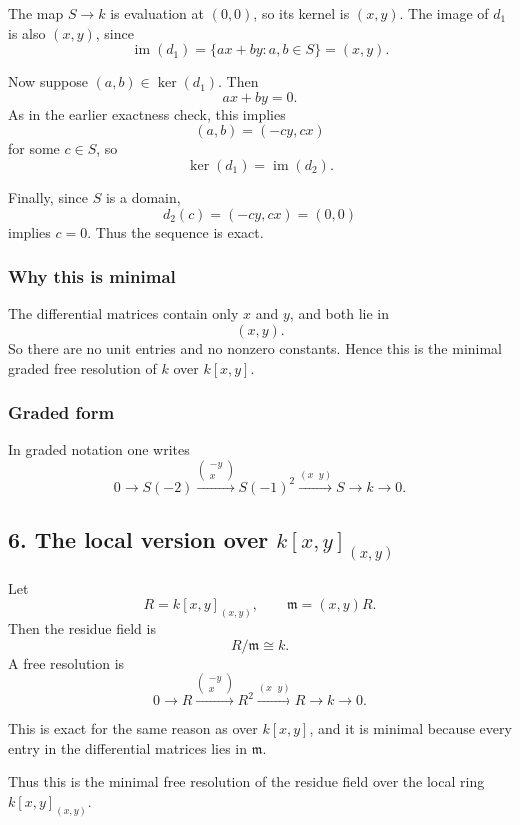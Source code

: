 \documentclass[12pt,a4paper]{article}
\theoremstyle{notespace}
\theoremstyle{definition}
\begin{document}
The map \(S\to k\) is evaluation at \((0,0)\), so its kernel is \((x,y)\).
The image of \(d_1\) is also \((x,y)\), since
\[
\operatorname{im}(d_1)=\{ax+by:a,b\in S\}=(x,y).
\]

Now suppose \((a,b)\in \ker(d_1)\). Then
\[
ax+by=0.
\]
As in the earlier exactness check, this implies
\[
(a,b)=(-cy,cx)
\]
for some \(c\in S\), so
\[
\ker(d_1)=\operatorname{im}(d_2).
\]

Finally, since \(S\) is a domain,
\[
d_2(c)=(-cy,cx)=(0,0)
\]
implies \(c=0\).
Thus the sequence is exact.

\subsubsection*{Why this is minimal}

The differential matrices contain only \(x\) and \(y\), and both lie in
\[
(x,y).
\]
So there are no unit entries and no nonzero constants.
Hence this is the minimal graded free resolution of \(k\) over \(k[x,y]\).

\subsubsection*{Graded form}

In graded notation one writes
\[
0 \longrightarrow S(-2) \xrightarrow{\begin{pmatrix}-y\\x\end{pmatrix}} S(-1)^2
\xrightarrow{(x\;\;y)} S \longrightarrow k \longrightarrow 0.
\]

\subsection{6. The local version over \(k[x,y]_{(x,y)}\)}

Let
\[
R=k[x,y]_{(x,y)},
\qquad
\mathfrak m=(x,y)R.
\]
Then the residue field is
\[
R/\mathfrak m \cong k.
\]
A free resolution is
\[
0 \longrightarrow R \xrightarrow{\begin{pmatrix}-y\\x\end{pmatrix}} R^2
\xrightarrow{(x\;\;y)} R \longrightarrow k \longrightarrow 0.
\]

This is exact for the same reason as over \(k[x,y]\), and it is minimal because every entry in the differential matrices lies in \(\mathfrak m\).

Thus this is the minimal free resolution of the residue field over the local ring \(k[x,y]_{(x,y)}\).
\end{document}

